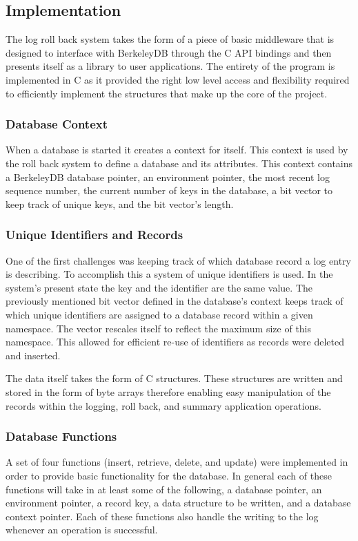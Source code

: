 \documentclass{article}
\begin{document}
\subsection{Implementation}
The log roll back system takes the form of a piece of basic middleware that is designed to interface with BerkeleyDB through the C API bindings and then presents itself as a library to user applications. The entirety of the program is implemented in C as it provided the right low level access and flexibility required to efficiently implement the structures that make up the core of the project.

\subsubsection{Database Context}
When a database is started it creates a context for itself. This context is used by the roll back system to define a database and its attributes. This context contains a BerkeleyDB database pointer, an environment pointer, the most recent log sequence number, the current number of keys in the database, a bit vector to keep track of unique keys, and the bit vector's length. 

\subsubsection{Unique Identifiers and Records}
One of the first challenges was keeping track of which database record a log entry is describing. To accomplish this a system of unique identifiers is used. In the system's present state the key and the identifier are the same value. The previously mentioned bit vector defined in the database's context keeps track of which unique identifiers are assigned to a database record within a given namespace. The vector rescales itself to reflect the maximum size of this namespace. This allowed for efficient re-use of identifiers as records were deleted and inserted.

The data itself takes the form of C structures. These structures are written and stored in the form of byte arrays therefore enabling easy manipulation of the records within the logging, roll back, and summary application operations.


\subsubsection{Database Functions}
A set of four functions (insert, retrieve, delete, and update) were implemented in order to provide basic functionality for the database. In general each of these functions will take in at least some of the following, a database pointer, an environment pointer, a record key, a data structure to be written, and a database context pointer. Each of these functions also handle the writing to the log whenever an operation is successful.
\end{document}
